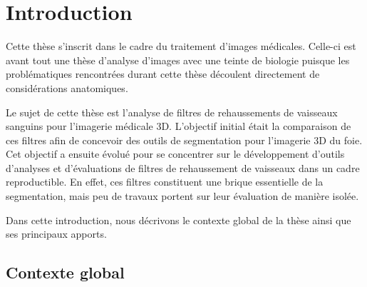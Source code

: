 %

\chapter{Introduction}
\label{sec:introduction}



Cette thèse s'inscrit dans le cadre du traitement d'images médicales. Celle-ci est avant tout une thèse d'analyse d'images avec une teinte de biologie puisque les problématiques rencontrées durant cette thèse découlent directement de considérations anatomiques.

Le sujet de cette thèse est l'analyse de filtres de rehaussements de vaisseaux sanguins pour l'imagerie médicale 3D. L'objectif initial était la comparaison de ces filtres afin de concevoir des outils de segmentation pour l'imagerie 3D du foie. Cet objectif a ensuite évolué pour se concentrer sur le développement d'outils d'analyses et d'évaluations de filtres de rehaussement de vaisseaux dans un cadre reproductible. En effet, ces filtres constituent une brique essentielle de la segmentation, mais peu de travaux portent sur leur évaluation de manière isolée.

Dans cette introduction, nous décrivons le contexte global de la thèse ainsi que ses principaux apports.

\section{Contexte global}


